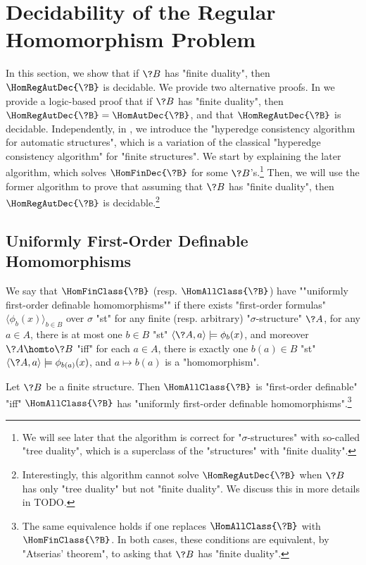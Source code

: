\section{\AP\label{sec:dichotomy-decidability}%
	Decidability of the Regular Homomorphism Problem}

In this section, we show that if $\?B$ has "finite duality", then $\HomRegAutDec{\?B}$ is decidable.
We provide two alternative proofs. In  we provide
a logic-based proof that if $\?B$ has "finite duality", then $\HomRegAutDec{\?B} = \HomAutDec{\?B}$,
and that $\HomRegAutDec{\?B}$ is decidable.
Independently, in ,
we introduce the "hyperedge consistency algorithm for automatic structures",
which is a variation of the classical "hyperedge consistency algorithm" for "finite structures".
We start by explaining the later algorithm,
which solves $\HomFinDec{\?B}$ for some $\?B$'s.\footnote{We will
see later that the algorithm is correct for "$\sigma$-structures" with so-called "tree duality",
which is a superclass of the "structures" with "finite duality".}
Then, we will use the former algorithm to prove that assuming that $\?B$ has "finite duality",
then $\HomRegAutDec{\?B}$ is decidable.\footnote{Interestingly, this algorithm cannot solve
$\HomRegAutDec{\?B}$ when $\?B$ has only "tree duality" but not "finite duality". 
We discuss this in more details in TODO.}

\subsection{\AP\label{sec:uniformly-first-order-definable-hom}%
	Uniformly First-Order Definable Homomorphisms}

We say that $\HomFinClass{\?B}$ (resp. $\HomAllClass{\?B}$)
have \AP""uniformly first-order definable homomorphisms"" if there exists "first-order formulas"
$\langle \phi_b(x) \rangle_{b\in B}$ over $\sigma$ "st" for any finite
(resp. arbitrary) "$\sigma$-structure" $\?A$, for any $a\in A$,
there is at most one $b \in B$ "st" $\langle \?A, a \rangle \models \phi_b(x)$, and moreover $\?A \homto \?B$
"iff" for each $a\in A$, there is exactly one $b(a) \in B$ "st" $\langle \?A, a \rangle \models \phi_{b(a)}(x)$, and $a \mapsto b(a)$ is a "homomorphism".

\begin{lemma}
	\AP\label{lemma:finite-duality-uniformly-definable-homomorphisms}
	Let $\?B$ be a finite structure. Then $\HomAllClass{\?B}$ is "first-order definable" "iff"
	$\HomAllClass{\?B}$ has "uniformly first-order definable homomorphisms".\footnote{The same 
	equivalence holds if one replaces $\HomAllClass{\?B}$ with $\HomFinClass{\?B}$.
	In both cases, these conditions are equivalent, by "Atserias' theorem", to asking that $\?B$
	has "finite duality".}
\end{lemma}

